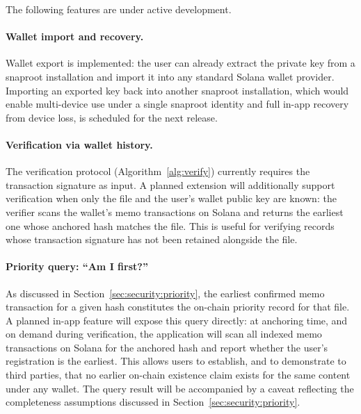 \documentclass[11pt,a4paper]{article}
\begin{document}
The following features are under active development.

\paragraph{Wallet import and recovery.} Wallet export is implemented:
the user can already extract the private key from a snaproot
installation and import it into any standard Solana wallet provider.
Importing an exported key back into another snaproot installation,
which would enable multi-device use under a single snaproot identity
and full in-app recovery from device loss, is scheduled for the next
release.

\paragraph{Verification via wallet history.} The verification protocol
(Algorithm~\ref{alg:verify}) currently requires the transaction
signature as input. A planned extension will additionally support
verification when only the file and the user's wallet public key are
known: the verifier scans the wallet's memo transactions on Solana and
returns the earliest one whose anchored hash matches the file. This is
useful for verifying records whose transaction signature has not been
retained alongside the file.

\paragraph{Priority query: ``Am I first?''} As discussed in
Section~\ref{sec:security:priority}, the earliest confirmed memo
transaction for a given hash constitutes the on-chain priority record
for that file. A planned in-app feature will expose this query
directly: at anchoring time, and on demand during verification, the
application will scan all indexed memo transactions on Solana for
the anchored hash and report whether the user's registration is the
earliest. This allows users to establish, and to demonstrate to third
parties, that no earlier on-chain existence claim exists for the same
content under any wallet. The query result will be accompanied by a
caveat reflecting the completeness assumptions discussed in
Section~\ref{sec:security:priority}.
\end{document}
